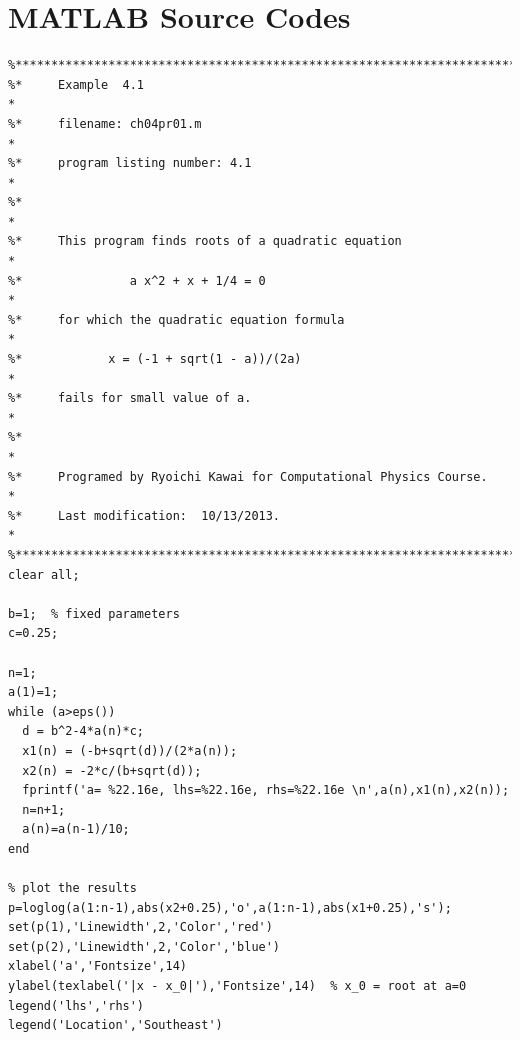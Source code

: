 \newpage
\section*{MATLAB Source Codes}


\bigskip\noindent
\program
\label{prog:quad_trick}

\footnotesize
\begin{verbatim}
%**************************************************************************
%*     Example  4.1                                                       *
%*     filename: ch04pr01.m                                               *
%*     program listing number: 4.1                                        *
%*                                                                        *
%*     This program finds roots of a quadratic equation                   *
%*               a x^2 + x + 1/4 = 0                                      *
%*     for which the quadratic equation formula                           * 
%*            x = (-1 + sqrt(1 - a))/(2a)                                 *
%*     fails for small value of a.                                        *
%*                                                                        *
%*     Programed by Ryoichi Kawai for Computational Physics Course.       *
%*     Last modification:  10/13/2013.                                    *
%**************************************************************************
clear all;

b=1;  % fixed parameters
c=0.25;

n=1;
a(1)=1;
while (a>eps())
  d = b^2-4*a(n)*c;
  x1(n) = (-b+sqrt(d))/(2*a(n));
  x2(n) = -2*c/(b+sqrt(d));
  fprintf('a= %22.16e, lhs=%22.16e, rhs=%22.16e \n',a(n),x1(n),x2(n));
  n=n+1;
  a(n)=a(n-1)/10;
end

% plot the results
p=loglog(a(1:n-1),abs(x2+0.25),'o',a(1:n-1),abs(x1+0.25),'s');
set(p(1),'Linewidth',2,'Color','red')
set(p(2),'Linewidth',2,'Color','blue')
xlabel('a','Fontsize',14)
ylabel(texlabel('|x - x_0|'),'Fontsize',14)  % x_0 = root at a=0
legend('lhs','rhs')
legend('Location','Southeast')
\end{verbatim}
\normalsize


